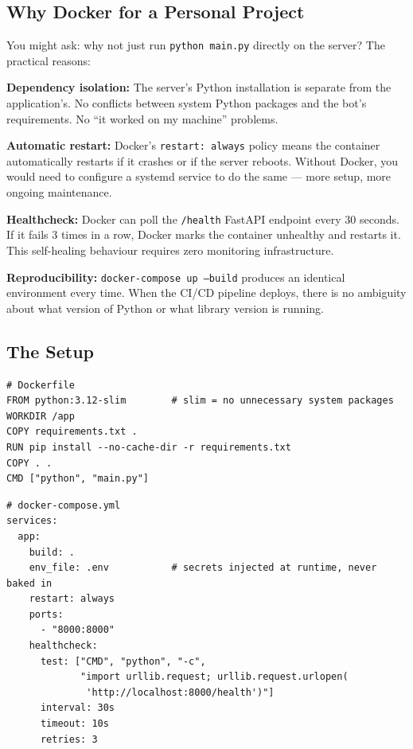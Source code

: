 \documentclass[12pt, a4paper]{article}
\begin{document}
\subsection{Why Docker for a Personal Project}

You might ask: why not just run \texttt{python main.py} directly on the server? The practical reasons:

\textbf{Dependency isolation:} The server's Python installation is separate from the application's. No conflicts between system Python packages and the bot's requirements. No ``it worked on my machine'' problems.

\textbf{Automatic restart:} Docker's \texttt{restart: always} policy means the container automatically restarts if it crashes or if the server reboots. Without Docker, you would need to configure a systemd service to do the same --- more setup, more ongoing maintenance.

\textbf{Healthcheck:} Docker can poll the \texttt{/health} FastAPI endpoint every 30 seconds. If it fails 3 times in a row, Docker marks the container unhealthy and restarts it. This self-healing behaviour requires zero monitoring infrastructure.

\textbf{Reproducibility:} \texttt{docker-compose up --build} produces an identical environment every time. When the CI/CD pipeline deploys, there is no ambiguity about what version of Python or what library version is running.

\subsection{The Setup}

\begin{lstlisting}
# Dockerfile
FROM python:3.12-slim        # slim = no unnecessary system packages
WORKDIR /app
COPY requirements.txt .
RUN pip install --no-cache-dir -r requirements.txt
COPY . .
CMD ["python", "main.py"]
\end{lstlisting}

\begin{lstlisting}
# docker-compose.yml
services:
  app:
    build: .
    env_file: .env           # secrets injected at runtime, never baked in
    restart: always
    ports:
      - "8000:8000"
    healthcheck:
      test: ["CMD", "python", "-c",
             "import urllib.request; urllib.request.urlopen(
              'http://localhost:8000/health')"]
      interval: 30s
      timeout: 10s
      retries: 3
\end{lstlisting}
\end{document}
